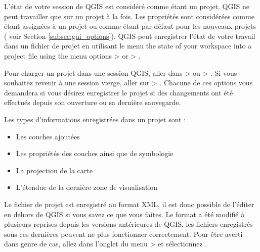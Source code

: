 L'état de votre session de QGIS est considéré comme étant un projet. QGIS ne peut travailler que sur un projet à la fois. Les propriétés sont considérées comme étant assignées à un projet ou comme étant par défaut pour les nouveaux projets ( voir Section \ref{subsec:gui_options}). QGIS peut enregistrer l'état de votre travail dans un fichier de projet en utilisant le menu the state of your 
workspace into a project file using the menu options 
 > 
or  > .

Pour charger un projet dans une session QGIS, aller dans  >  ou  > . Si vous souhaitez revenir à une session vierge, aller sur  > .
Chacune de ces options vous demandera si vous désirez enregistrer le projet si des changements ont été effectués depuis son ouverture ou sa dernière sauvegarde.

Les types d'informations enregistrées dans un projet sont :

\begin{itemize}
\item Les couches ajoutées
\item Les propriétés des couches ainsi que de symbologie
\item La projection de la carte
\item L'étendue de la dernière zone de visualisation
\end{itemize}

Le fichier de projet est enregistré au format XML, il est donc possible de l'éditer en dehors de QGIS si vous savez ce que vous faites. Le format a été modifié à plusieurs reprises depuis les versions antérieures de QGIS, les fichiers enregistrés sous ces dernières peuvent ne plus fonctionner correctement. Pour être averti dans genre de cas, allez dans l'onglet  du menu  >  et sélectionnez .

